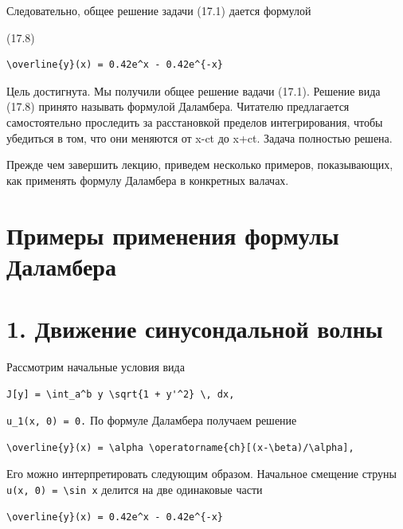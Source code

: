 \documentclass[
  ukrainian,
]{article}
\begin{document}
Следовательно, общее решение задачи (17.1) дается формулой

(17.8)

\begin{verbatim}
\overline{y}(x) = 0.42e^x - 0.42e^{-x}
\end{verbatim}

Цель достигнута. Мы получили общее решение вадачи (17.1). Решение вида
(17.8) принято называть формулой Даламбера. Читателю предлагается
самостоятельно проследить за расстановкой пределов интегрирования, чтобы
убедиться в том, что они меняются от x-ct до x+ct. Задача полностью
решена.

Прежде чем завершить лекцию, приведем несколько примеров, показывающих,
как применять формулу Даламбера в конкретных валачах.

\section{Примеры применения формулы
Даламбера}\label{ux43fux440ux438ux43cux435ux440ux44b-ux43fux440ux438ux43cux435ux43dux435ux43dux438ux44f-ux444ux43eux440ux43cux443ux43bux44b-ux434ux430ux43bux430ux43cux431ux435ux440ux430}

\section{1. Движение синусондальной
волны}\label{ux434ux432ux438ux436ux435ux43dux438ux435-ux441ux438ux43dux443ux441ux43eux43dux434ux430ux43bux44cux43dux43eux439-ux432ux43eux43bux43dux44b}

Рассмотрим начальные условия вида

\begin{verbatim}
J[y] = \int_a^b y \sqrt{1 + y'^2} \, dx,
\end{verbatim}

\texttt{u\_1(x,\ 0)\ =\ 0.} По формуле Даламбера получаем решение

\begin{verbatim}
\overline{y}(x) = \alpha \operatorname{ch}[(x-\beta)/\alpha],
\end{verbatim}

Его можно интерпретировать следующим образом. Начальное смещение струны
\texttt{u(x,\ 0)\ =\ \textbackslash{}sin\ x} делится на две одинаковые
части

\begin{verbatim}
\overline{y}(x) = 0.42e^x - 0.42e^{-x}
\end{verbatim}
\end{document}
